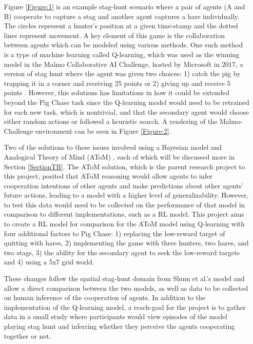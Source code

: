 \documentclass[10pt,twocolumn]{article}
\begin{document}
Figure \ref{Figure:1} is an example stag-hunt scenario \cite{Rabkina2019} where a pair of agents (A and B) cooperate to capture a stag and another agent captures a hare individually.
The circles represent a hunter's position at a given time-stamp and the dotted lines represent movement.
A key element of this game is the collaboration between agents which can be modeled using various methods.
One such method is a type of machine learning called Q-learning, which was used as the winning model in the Malmo Collaborative AI Challenge, hosted by Microsoft in 2017, a version of stag hunt where the agent was given two choices: 1) catch the pig by trapping it in a corner and receiving 25 points or 2) giving up and receive 5 points \cite{Katja2017}.
However, this solutions has limitations in how it could be extended beyond the Pig Chase task since the Q-learning model would need to be retrained for each new task, which is nontrivial, and that the secondary agent would choose either random actions or followed a heuristic search.
A rendering of the Malmo-Challenge environment can be seen in Figure \ref{Figure:2}.

Two of the solutions to these issues involved using a Bayesian model \cite{Shum2019} and Analogical Theory of Mind (AToM) \cite{Rabkina2019}, each of which will be discussed more in Section \ref{SectionTB}.
The AToM solution, which is the parent research project to this project, posited that AToM reasoning would allow agents to infer cooperation intentions of other agents and make predictions about other agents' future actions, leading to a model with a higher level of generalizability.
However, to test this data would need to be collected on the performance of that model in comparison to different implementations, such as a RL model.
This project aims to create a RL model for comparison for the AToM model using Q-learning with four additional factors to Pig Chase: 1) replacing the low-reward target of quitting with hares, 2) implementing the game with three hunters, two hares, and two stags, 3) the ability for the secondary agent to seek the low-reward targets and 4) using a 5x7 grid world.

These changes follow the spatial stag-hunt domain from Shum et al.'s model and allow a direct comparison between the two models, as well as data to be collected on human inference of the cooperation of agents.
In addition to the implementation of the Q-learning model, a reach-goal for the project is to gather data in a small study where participants would view episodes of the model playing stag hunt and inferring whether they perceive the agents cooperating together or not.
\end{document}
